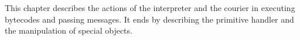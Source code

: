 \secdown

This chapter describes the actions of the interpreter and the courier in
executing bytecodes and passing messages. It ends by describing the primitive
handler and the manipulation of special objects.


\secup
